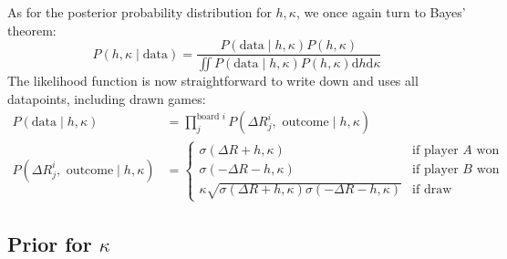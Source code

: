 \documentclass[12pt]{article}
\begin{document}
	As for the posterior probability distribution for $h,\kappa$, we once again turn to Bayes' theorem:
	\begin{equation}
	P(h, \kappa\mid\text{data}) = \frac{P(\text{data}\mid h, \kappa)P(h,\kappa)}{\iint P(\text{data}\mid h, \kappa)P(h,\kappa)\text{d}h\text{d}\kappa}
	\end{equation}
	The likelihood function is now straightforward to write down and uses all datapoints, including drawn games:
	\begin{align}
	P(\text{data}\mid h, \kappa) &= \prod_j^{\text{board }i} P(\Delta R^i_j,\text{ outcome}\mid h,\kappa)\\
	P(\Delta R^i_j,\text{ outcome}\mid h,\kappa) &= \begin{cases}
		\sigma(\Delta R + h, \kappa) & \text{if player }A\text{ won}\\
		\sigma(-\Delta R - h, \kappa) & \text{if player }B\text{ won}\\
		\kappa\sqrt{\sigma(\Delta R + h, \kappa)\sigma(-\Delta R - h, \kappa)} & \text{if draw}
	\end{cases} \nonumber
	\end{align}
	\subsection{Prior for $\kappa$} \label{kappa_prior}
\end{document}
